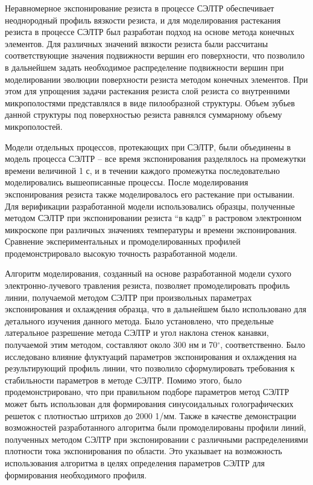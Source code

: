Неравномерное экспонирование резиста в процессе СЭЛТР обеспечивает неоднородный профиль вязкости резиста, и для моделирования растекания резиста в процессе СЭЛТР был разработан подход на основе метода конечных элементов. Для различных значений вязкости резиста были рассчитаны соответствующие значения подвижности вершин его поверхности, что позволило в дальнейшем задать необходимое распределение подвижности вершин при моделировании эволюции поверхности резиста методом конечных элементов. При этом для упрощения задачи растекания резиста слой резиста со внутренними микрополостями представлялся в виде пилообразной структуры. Объем зубьев данной структуры под поверхностью резиста равнялся суммарному объему микрополостей.

Модели отдельных процессов, протекающих при СЭЛТР, были объединены в модель процесса СЭЛТР -- все время экспонирования разделялось на промежутки времени величиной 1 с, и в течении каждого промежутка последовательно моделировались вышеописанные процессы. После моделирования экспонирования резиста также моделировалось его растекание при остывании. Для верификации разработанной модели использовались образцы, полученные методом СЭЛТР при экспонировании резиста ``в кадр'' в растровом электронном микроскопе при различных значениях температуры и времени экспонирования. Сравнение экспериментальных и промоделированных профилей продемонстрировало высокую точность разработанной модели.

Алгоритм моделирования, созданный на основе разработанной модели сухого электронно-лучевого травления резиста, позволяет промоделировать профиль линии, получаемой методом СЭЛТР при произвольных параметрах экспонирования и охлаждения образца, что в дальнейшем было использовано для детального изучения данного метода. Было установлено, что предельные латеральное разрешение метода СЭЛТР и угол наклона стенок канавки, получаемой этим методом, составляют около 300 нм и 70$^\circ$, соответственно. Было исследовано влияние флуктуаций параметров экспонирования и охлаждения на результирующий профиль линии, что позволило сформулировать требования к стабильности параметров в методе СЭЛТР.  Помимо этого, было продемонстрировано, что при правильном подборе параметров метод СЭЛТР может быть использован для формирования синусоидальных голографических решеток с плотностью штрихов до 2000 1/мм. Также в качестве демонстрации возможностей разработанного алгоритма были промоделированы профили линий, полученных методом СЭЛТР при экспонировании с различными распределениями плотности тока экспонирования по области. Это указывает на возможность использования алгоритма в целях определения параметров СЭЛТР для формирования необходимого профиля.

